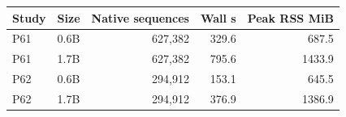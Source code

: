 \begin{tabular}{llrrr}\toprule
Study & Size & Native sequences & Wall s & Peak RSS MiB\\\midrule
P61 & 0.6B & 627,382 & 329.6 & 687.5\\
P61 & 1.7B & 627,382 & 795.6 & 1433.9\\
P62 & 0.6B & 294,912 & 153.1 & 645.5\\
P62 & 1.7B & 294,912 & 376.9 & 1386.9\\
\bottomrule\end{tabular}

